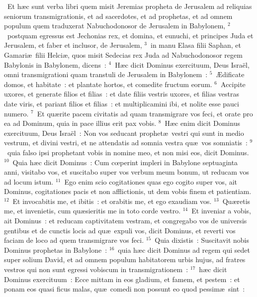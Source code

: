 ~\lettrine[lines=10,image=true,loversize=0.05,lraise=-0.03]{E}{}t h\ae c sunt verba libri quem misit Jeremias propheta de Jerusalem ad reliquias seniorum transmigrationis, et ad sacerdotes, et ad prophetas, et ad omnem populum quem traduxerat Nabuchodonosor de Jerusalem in Babylonem,
${}^{2}$~postquam egressus est Jechonias rex, et domina, et eunuchi, et principes Juda et Jerusalem, et faber et inclusor, de Jerusalem,
${}^{3}$~in manu Elasa filii Saphan, et Gamari\ae\ filii Helci\ae , quos misit Sedecias rex Juda ad Nabuchodonosor regem Babylonis in Babylonem, dicens~:
${}^{4}$~H\ae c dicit Dominus exercituum, Deus Isra\"el, omni transmigrationi quam transtuli de Jerusalem in Babylonem~:
${}^{5}$~\AE dificate domos, et habitate~: et plantate hortos, et comedite fructum eorum.
${}^{6}$~Accipite uxores, et generate filios et filias~: et date filiis vestris uxores, et filias vestras date viris, et pariant filios et filias~: et multiplicamini ibi, et nolite esse pauci numero.
${}^{7}$~Et qu\ae rite pacem civitatis ad quam transmigrare vos feci, et orate pro ea ad Dominum, quia in pace illius erit pax vobis.
${}^{8}$~H\ae c enim dicit Dominus exercituum, Deus Isra\"el~: Non vos seducant prophet\ae\ vestri qui sunt in medio vestrum, et divini vestri, et ne attendatis ad somnia vestra qu\ae\ vos somniatis~:
${}^{9}$~quia falso ipsi prophetant vobis in nomine meo, et non misi eos, dicit Dominus.
${}^{10}$~Quia h\ae c dicit Dominus~: Cum cœperint impleri in Babylone septuaginta anni, visitabo vos, et suscitabo super vos verbum meum bonum, ut reducam vos ad locum istum.
${}^{11}$~Ego enim scio cogitationes quas ego cogito super vos, ait Dominus, cogitationes pacis et non afflictionis, ut dem vobis finem et patientiam.
${}^{12}$~Et invocabitis me, et ibitis~: et orabitis me, et ego exaudiam vos.
${}^{13}$~Qu\ae retis me, et invenietis, cum qu\ae sieritis me in toto corde vestro.
${}^{14}$~Et inveniar a vobis, ait Dominus~: et reducam captivitatem vestram, et congregabo vos de universis gentibus et de cunctis locis ad qu\ae\ expuli vos, dicit Dominus, et reverti vos faciam de loco ad quem transmigrare vos feci.
${}^{15}$~Quia dixistis~: Suscitavit nobis Dominus prophetas in Babylone~:
${}^{16}$~quia h\ae c dicit Dominus ad regem qui sedet super solium David, et ad omnem populum habitatorem urbis hujus, ad fratres vestros qui non sunt egressi vobiscum in transmigrationem~:
${}^{17}$~h\ae c dicit Dominus exercituum~: Ecce mittam in eos gladium, et famem, et pestem~: et ponam eos quasi ficus malas, qu\ae\ comedi non possunt eo quod pessim\ae\ sint~:
